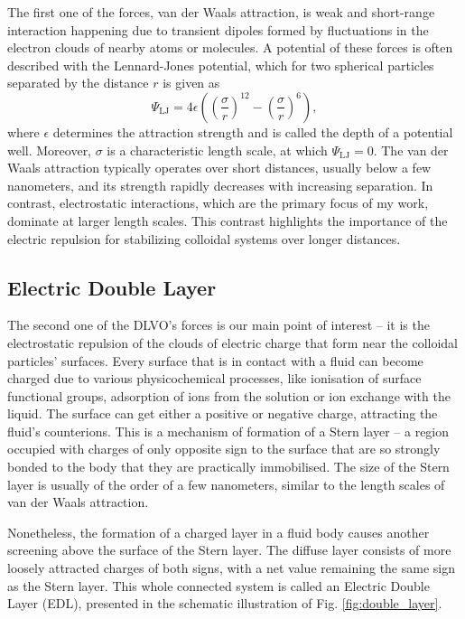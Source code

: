 \documentclass{master_thesis}
\begin{document}
The first one of the forces, van der Waals attraction, is weak and short-range interaction happening due to transient dipoles formed by fluctuations in the electron clouds of nearby atoms or molecules. A potential of these forces is often described with the Lennard-Jones potential, which for two spherical particles separated by the distance $r$ is given as
\begin{equation}
    \Psi_{\textrm{LJ}} = 4\epsilon \left( \left(\frac{\sigma}{r}\right)^{12} - \left(\frac{\sigma}{r}\right)^6 \right),
\label{eqn:lennard_jones}
\end{equation}
where $\epsilon$ determines the attraction strength and is called the depth of a potential well. Moreover, $\sigma$ is a characteristic length scale, at which $\Psi_{\textrm{LJ}}=0$. The van der Waals attraction typically operates over short distances, usually below a few nanometers, and its strength rapidly decreases with increasing separation. In contrast, electrostatic interactions, which are the primary focus of my work, dominate at larger length scales. This contrast highlights the importance of the electric repulsion for stabilizing colloidal systems over longer distances.


\subsection{Electric Double Layer}

The second one of the DLVO's forces is our main point of interest -- it is the electrostatic repulsion of the clouds of electric charge that form near the colloidal particles' surfaces. Every surface that is in contact with a fluid can become charged due to various physicochemical processes, like ionisation of surface functional groups, adsorption of ions from the solution or ion exchange with the liquid. The surface can get either a positive or negative charge, attracting the fluid's counterions. This is a mechanism of formation of a Stern layer -- a region occupied with charges of only opposite sign to the surface that are so strongly bonded to the body that they are practically immobilised. The size of the Stern layer is usually of the order of a few nanometers, similar to the length scales of van der Waals attraction.

Nonetheless, the formation of a charged layer in a fluid body causes another screening above the surface of the Stern layer. The diffuse layer consists of more loosely attracted charges of both signs, with a net value remaining the same sign as the Stern layer. This whole connected system is called an Electric Double Layer (EDL), presented in the schematic illustration of Fig. \ref{fig:double_layer}.
\end{document}
